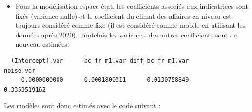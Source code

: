 \documentclass[
  a4paper,
  DIV=11,
  numbers=noendperiod,
  french]{scrartcl}
\newenvironment{Shaded}{\begin{snugshade}}{\end{snugshade}}
\newcommand{\AttributeTok}[1]{\textcolor[rgb]{0.40,0.45,0.13}{#1}}
\newcommand{\ConstantTok}[1]{\textcolor[rgb]{0.56,0.35,0.01}{#1}}
\newcommand{\DecValTok}[1]{\textcolor[rgb]{0.68,0.00,0.00}{#1}}
\newcommand{\FunctionTok}[1]{\textcolor[rgb]{0.28,0.35,0.67}{#1}}
\newcommand{\NormalTok}[1]{\textcolor[rgb]{0.00,0.23,0.31}{#1}}
\newcommand{\OtherTok}[1]{\textcolor[rgb]{0.00,0.23,0.31}{#1}}
\newcommand{\SpecialCharTok}[1]{\textcolor[rgb]{0.37,0.37,0.37}{#1}}
\providecommand{\tightlist}{%
  \setlength{\itemsep}{0pt}\setlength{\parskip}{0pt}}\usepackage{longtable,booktabs,array}
\newcommand\1{{\mathds 1}}
\theoremstyle{remark}
\begin{document}
\begin{itemize}
\tightlist
\item
  Pour la modélisation espace-état, les coefficients associés aux
  indicatrices sont fixés (variance nulle) et le coefficient du climat
  des affaires en niveau est toujours considéré comme fixe (il est
  considéré comme mobile en utilisant les données après 2020). Toutefois
  les variances des autres coefficients sont de nouveau estimées.
\end{itemize}

\begin{Shaded}
\end{Shaded}

\begin{verbatim}
  (Intercept).var      bc_fr_m1.var diff_bc_fr_m1.var         noise.var 
     0.0000000000      0.0001800311      0.0130758849      0.3353519162 
\end{verbatim}

Les modèles sont donc estimés avec le code suivant :
\end{document}
